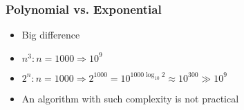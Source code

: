 




\begin{frame}[allowframebreaks] \frametitle{Polynomial vs. Exponential}
  \begin{itemize}
\item Big difference
\item $n^3: n = 1000 \Rightarrow 10^9$
\item $2^n: n = 1000 \Rightarrow 2^{1000}
=10^{1000\log_{10}2}
\approx
10^{300}
\gg 10^9$

\item An algorithm with such complexity is not practical
\end{itemize}\end{frame}

